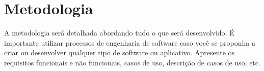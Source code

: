 %
%
%


\chapter{Metodologia}
\label{sec:metod}

A metodologia será detalhada abordando tudo o que será desenvolvido. É
importante utilizar processos de engenharia de software caso você se proponha a
criar ou desenvolver qualquer tipo de software ou aplicativo. Apresente os
requisitos funcionais e não funcionais, casos de uso, descrição de casos de uso,
etc.
